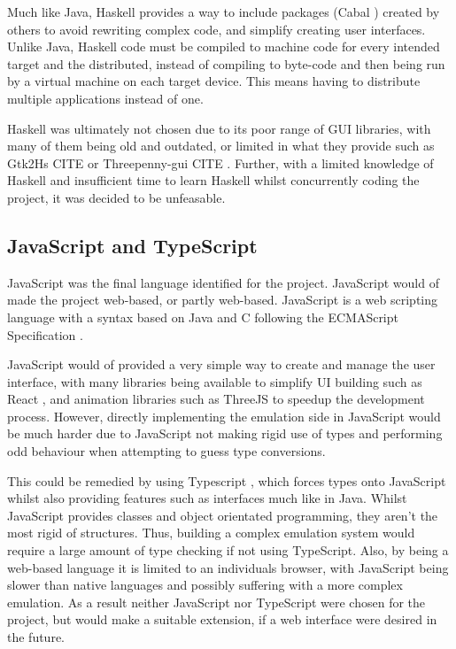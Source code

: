 Much like Java, Haskell provides a way to include packages (Cabal \cite{haskell_2023_the}) created by others to avoid rewriting complex code, and simplify creating user interfaces. Unlike Java, Haskell code must be compiled to machine code for every intended target and the distributed, instead of compiling to byte-code and then being run by a virtual machine on each target device. This means having to distribute multiple applications instead of one.

Haskell was ultimately not chosen due to its poor range of GUI libraries, with many of them being old and outdated, or limited in what they provide such as Gtk2Hs \cite{haskell_2023_gtk2hs} CITE or Threepenny-gui \cite{threepennygui_2017_about} CITE . Further, with a limited knowledge of Haskell and insufficient time to learn Haskell whilst concurrently coding the project, it was decided to be unfeasable.

\subsection{JavaScript and TypeScript}
JavaScript was the final language identified for the project. JavaScript would of made the project web-based, or partly web-based. JavaScript is a web scripting language with a syntax based on Java and C following the ECMAScript Specification \cite{ecmainternational_2023_ecmascript}.

JavaScript would of provided a very simple way to create and manage the user interface, with many libraries being available to simplify \ac{UI} building such as React \cite{metaopensource_2023_react}, and animation libraries such as ThreeJS \cite{cabello_2023_threejs} to speedup the development process. However, directly implementing the emulation side in JavaScript would be much harder due to JavaScript not making rigid use of types and performing odd behaviour when attempting to guess type conversions.

This could be remedied by using Typescript \cite{microsoftcorporation_2020_javascript}, which forces types onto JavaScript whilst also providing features such as interfaces much like in Java. Whilst JavaScript provides classes and object orientated programming, they aren't the most rigid of structures. Thus, building a complex emulation system would require a large amount of type checking if not using TypeScript. Also, by being a web-based language it is limited to an individuals browser, with JavaScript being slower than native languages and possibly suffering with a more complex emulation. As a result neither JavaScript nor TypeScript were  chosen for the project, but would make a suitable extension, if a web interface were desired in the future.


